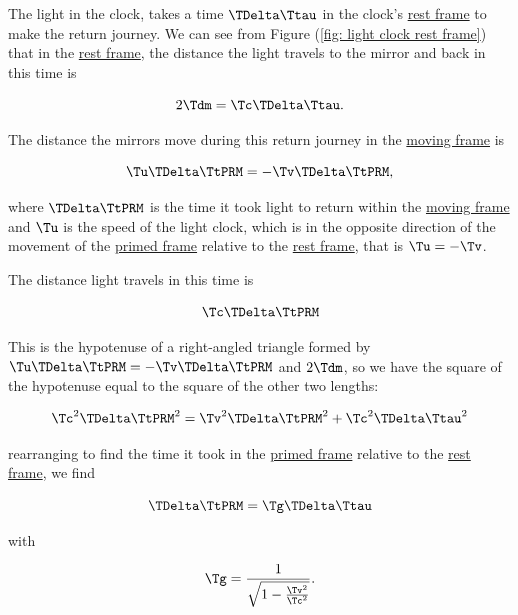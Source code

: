 The light in the clock, takes a time ${\TDelta \Ttau }$ in the clock's \hyperlink{def-proper-frame}{rest frame} to make the return journey.
We can see from Figure (\ref{fig: light clock rest frame}) that in the \hyperlink{def-proper-frame}{rest frame}, the distance the light travels to the mirror and back in this time is

\begin{equation}
	2{\Tdm } = {\Tc }{\TDelta \Ttau }.
\end{equation}

The distance the mirrors move during this return journey in the \hyperlink{def-Moving-Frame}{moving frame} is

\begin{equation}
	{\Tu }{\TDelta  \TtPRM  } =-{\Tv } {\TDelta  \TtPRM  },
\end{equation}

where ${\TDelta  \TtPRM  }$ is the time it took light to return within the \hyperlink{def-Moving-Frame}{moving frame} and ${\Tu }$ is the speed of the light clock, which is in the opposite direction of the movement of the \hyperlink{def-Primed-Frame}{primed frame} relative to the \hyperlink{def-proper-frame}{rest frame}, that is ${\Tu } =-{\Tv }$.

The distance light travels in this time is

\begin{equation}
	{\Tc }{\TDelta  \TtPRM  }
\end{equation}

This is the hypotenuse of a right-angled triangle formed by ${\Tu }{\TDelta  \TtPRM  }=-{\Tv }{\TDelta  \TtPRM  }$ and $2{\Tdm }$, so we have the square of the hypotenuse equal to the square of the other two lengths:

\begin{equation}
	\Tc ^2 \TDelta  \TtPRM ^2 = \Tv ^2 \TDelta  \TtPRM ^2 + \Tc ^2 \TDelta \Ttau ^2
\end{equation}

rearranging to find the time it took in the \hyperlink{def-Primed-Frame}{primed frame} relative to the \hyperlink{def-proper-frame}{rest frame}, we find

\begin{equation}
	\label{eq: time dilation}
	\TDelta  \TtPRM  = \Tg  \TDelta \Ttau
\end{equation}

with

\begin{equation}
	\Tg  = \frac{1}{\sqrt{1-\frac{ \Tv ^2}{ \Tc ^2} } }.
\end{equation}

